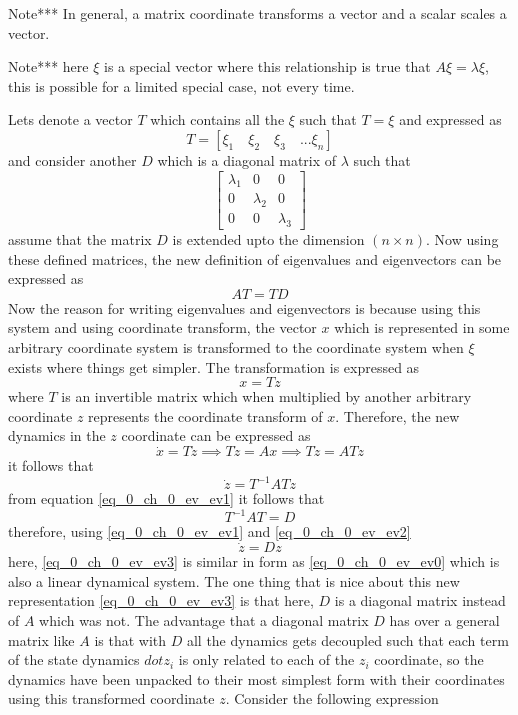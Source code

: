 Note*** In general, a matrix coordinate transforms a vector and a scalar scales a vector.

Note*** here $\xi$ is a special vector where this relationship is true that $A \xi = \lambda \xi$, this is possible for a limited special case, not every time.

Lets denote a vector $T$ which contains all the $\xi$ such that $T = \xi$ and expressed as
$$T = [\xi_1 \quad \xi_2 \quad \xi_3 \quad ... \xi_n]$$ and consider another $D$ which is a diagonal matrix of $\lambda$ such that
$$\begin{bmatrix}
\lambda_{1} & 0 & 0 \\ 0 & \lambda_{2} & 0 \\ 0 & 0 & \lambda_{3}
\end{bmatrix}$$
assume that the matrix $D$ is extended upto the dimension $(n\times n)$. Now using these defined matrices, the new definition of eigenvalues and eigenvectors can be expressed as
\begin{equation}\label{eq_0_ch_0_ev_ev1}
	AT = TD
\end{equation}
Now the reason for writing eigenvalues and eigenvectors is because using this system and using coordinate transform, the vector $x$ which is represented in some arbitrary coordinate system is transformed to the coordinate system when $\xi$ exists where things get simpler. The transformation is expressed as
$$x = Tz$$ where $T$ is an invertible matrix which when multiplied by another arbitrary coordinate $z$ represents the coordinate transform of $x$. Therefore, the new dynamics in the $z$ coordinate can be expressed as
\begin{equation}
	\dot{x} = T\dot{z} \implies T\dot{z} = Ax \implies  T\dot{z} = ATz
\end{equation}
it follows that
\begin{equation}\label{eq_0_ch_0_ev_ev2}
	\dot{z} = T^{-1}ATz
\end{equation}
from equation \eqref{eq_0_ch_0_ev_ev1} it follows that
\begin{equation}
	T^{-1}AT = D
\end{equation}
therefore, using \eqref{eq_0_ch_0_ev_ev1} and \eqref{eq_0_ch_0_ev_ev2}
\begin{equation}\label{eq_0_ch_0_ev_ev3}
	\dot{z} = Dz
\end{equation}
here, \eqref{eq_0_ch_0_ev_ev3} is similar in form as \eqref{eq_0_ch_0_ev_ev0} which is also a linear dynamical system. The one thing that is nice about this new representation \eqref{eq_0_ch_0_ev_ev3} is that here, $D$ is a diagonal matrix instead of $A$ which was not. The advantage that a diagonal matrix $D$ has over a general matrix like $A$ is that with $D$ all the dynamics gets decoupled such that each term of the state dynamics $dot{z}_{i}$ is only related to each of the $z_{i}$ coordinate, so the dynamics have been unpacked to their most simplest form with their coordinates using this transformed coordinate $z$. Consider the following expression
